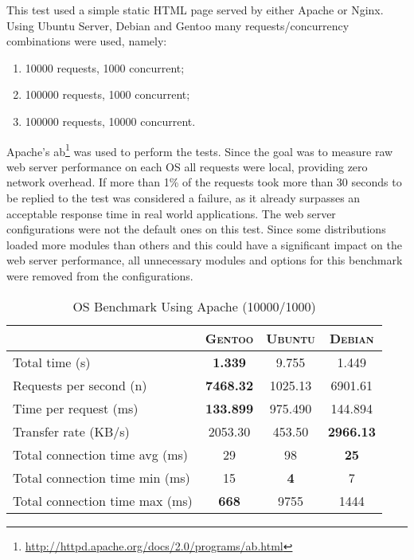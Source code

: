 This test used a simple static HTML page served by either Apache or Nginx. Using Ubuntu Server, Debian and Gentoo many requests/concurrency combinations were used, namely:
\begin{enumerate}
  \item 10000 requests, 1000 concurrent;
  \item 100000 requests, 1000 concurrent;
  \item 100000 requests, 10000 concurrent.
\end{enumerate}
Apache's ab\footnote{\url{http://httpd.apache.org/docs/2.0/programs/ab.html}} was used to perform the tests. Since the goal was to measure raw web server performance on each OS all requests were local, providing zero network overhead. If more than 1\% of the requests took more than 30 seconds to be replied to the test was considered a failure, as it already surpasses an acceptable response time in real world applications. The web server configurations were not the default ones on this test. Since some distributions loaded more modules than others and this could have a significant impact on the web server performance, all unnecessary modules and options for this benchmark were removed from the configurations.
\begin{table}[ht]
  \centering
  \caption{OS Benchmark Using Apache (10000/1000)}
  \label{tab:os_apache_10000_1000}
  
  \begin{tabular}{l|c|c|c}
    & \textbf{\textsc{Gentoo}} & \textbf{\textsc{Ubuntu}} & \textbf{\textsc{Debian}} \\ \hline
    Total time (s) & \textbf{1.339} & 9.755 & 1.449 \\ \hline
    Requests per second (n) & \textbf{7468.32} & 1025.13 & 6901.61 \\ \hline
    Time per request (ms) & \textbf{133.899} & 975.490 & 144.894 \\ \hline
    Transfer rate (KB/s) & 2053.30 & 453.50 & \textbf{2966.13} \\ \hline
    Total connection time avg (ms) & 29 & 98 & \textbf{25} \\ \hline
    Total connection time min (ms) & 15 & \textbf{4} & 7 \\ \hline
    Total connection time max (ms) & \textbf{668} & 9755 & 1444 \\
  \end{tabular}
\end{table}

